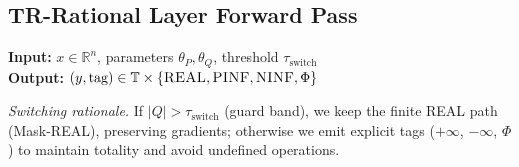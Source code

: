 \documentclass[twoside,11pt]{article}
\newcommand{\TR}{\mathbb{T}}
\newcommand{\trReal}{\textsc{REAL}}
\newcommand{\trPINF}{\textsc{PINF}}
\newcommand{\trNINF}{\textsc{NINF}}
\newcommand{\trPHI}{\textsc{$\Phi$}}
\newcommand{\TAGREAL}{\trReal}
\newcommand{\TAGPINF}{\trPINF}
\newcommand{\TAGNINF}{\trNINF}
\newcommand{\TAGPHI}{\trPHI}
\begin{document}

\subsection{TR-Rational Layer Forward Pass}

\begin{tcolorbox}[colback=gray!5!white,colframe=gray!75!black,title=\textbf{Algorithm \refstepcounter{algctr}\thealgctr: TR-Rational Layer Forward Pass}]
\label{alg:tr-forward}
\textbf{Input:} $x \in \mathbb{R}^n$, parameters $\theta_P, \theta_Q$, threshold $\tau_{\text{switch}}$ \\
\textbf{Output:} $ (y, \text{tag}) \in \TR \times \{\TAGREAL,\TAGPINF,\TAGNINF,\TAGPHI\} $


\noindent\emph{Switching rationale.} If $|Q| > \tau_{\text{switch}}$ (guard band), we keep the finite REAL path (Mask-REAL), preserving gradients; otherwise we emit explicit tags ($+\infty$, $-\infty$, $\Phi$) to maintain totality and avoid undefined operations.
\medskip


\end{tcolorbox}
\end{document}
